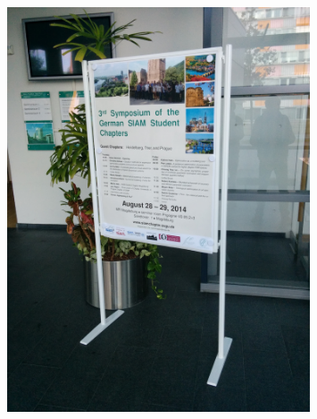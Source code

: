 \documentclass{beamer}
\begin{document}
\begin{frame}
\begin{columns}
 \begin{column}{0.4\textwidth}
  \begin{figure}[t]
  \centering
  \includegraphics[width=0.8\textwidth]{images/IMG_20140825_100740}
  \end{figure}
 \end{column}
 \end{columns}
\end{frame}
\end{document}
